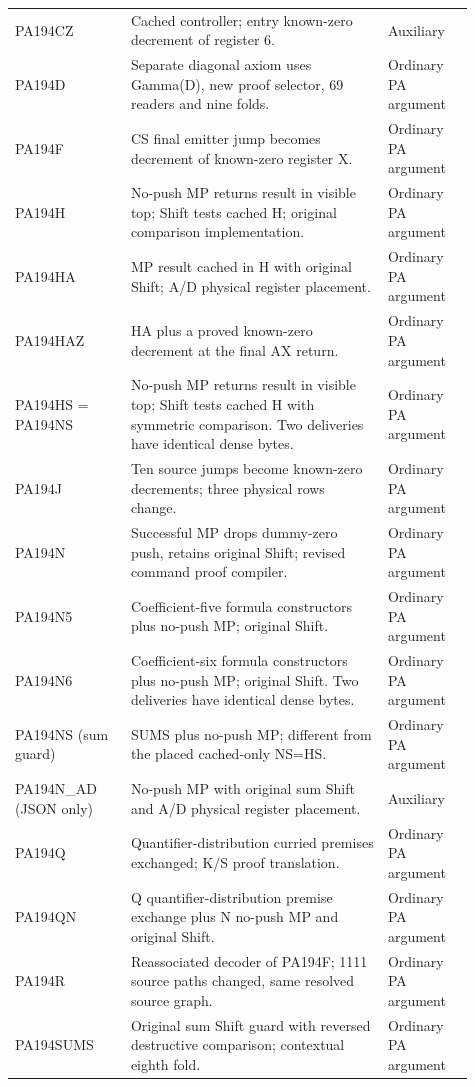 \begin{longtable}{p{0.23\linewidth}p{0.51\linewidth}p{0.17\linewidth}}
PA194CZ & Cached controller; entry known-zero decrement of register 6. & Auxiliary\\
PA194D & Separate diagonal axiom uses Gamma(D), new proof selector, 69 readers and nine folds. & Ordinary PA argument\\
PA194F & CS final emitter jump becomes decrement of known-zero register X. & Ordinary PA argument\\
PA194H & No-push MP returns result in visible top; Shift tests cached H; original comparison implementation. & Ordinary PA argument\\
PA194HA & MP result cached in H with original Shift; A/D physical register placement. & Ordinary PA argument\\
PA194HAZ & HA plus a proved known-zero decrement at the final AX return. & Ordinary PA argument\\
PA194HS = PA194NS & No-push MP returns result in visible top; Shift tests cached H with symmetric comparison. Two deliveries have identical dense bytes. & Ordinary PA argument\\
PA194J & Ten source jumps become known-zero decrements; three physical rows change. & Ordinary PA argument\\
PA194N & Successful MP drops dummy-zero push, retains original Shift; revised command proof compiler. & Ordinary PA argument\\
PA194N5 & Coefficient-five formula constructors plus no-push MP; original Shift. & Ordinary PA argument\\
PA194N6 & Coefficient-six formula constructors plus no-push MP; original Shift. Two deliveries have identical dense bytes. & Ordinary PA argument\\
PA194NS (sum guard) & SUMS plus no-push MP; different from the placed cached-only NS=HS. & Ordinary PA argument\\
PA194N\_AD (JSON only) & No-push MP with original sum Shift and A/D physical register placement. & Auxiliary\\
PA194Q & Quantifier-distribution curried premises exchanged; K/S proof translation. & Ordinary PA argument\\
PA194QN & Q quantifier-distribution premise exchange plus N no-push MP and original Shift. & Ordinary PA argument\\
PA194R & Reassociated decoder of PA194F; 1111 source paths changed, same resolved source graph. & Ordinary PA argument\\
PA194SUMS & Original sum Shift guard with reversed destructive comparison; contextual eighth fold. & Ordinary PA argument\\

\end{longtable}
